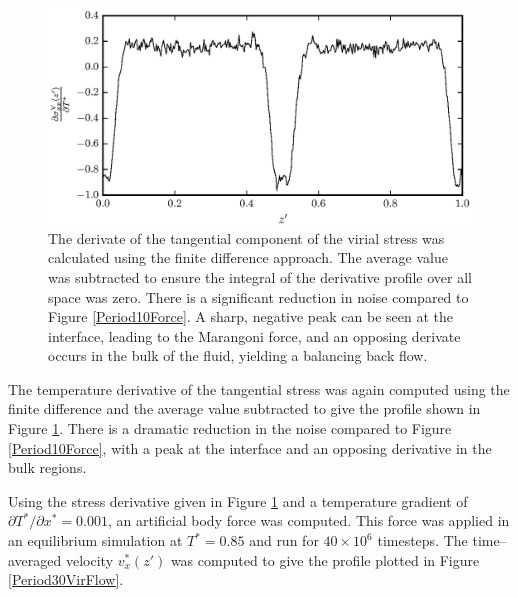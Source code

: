 \begin{figure}[h!]
\centering
\includegraphics[scale=1.0]{Period30VirForce}
\caption{The derivate of the tangential component of the virial stress was calculated using the finite difference approach.
The average value was subtracted to ensure the integral of the derivative profile over all space was zero.
There is a significant reduction in noise compared to Figure \ref{Period10Force}.
A sharp, negative peak can be seen at the interface, leading to the Marangoni force, and an opposing derivate occurs in the bulk of the fluid, yielding a balancing back flow.
}
\label{Period30VirForce}
\end{figure}

The temperature derivative of the tangential stress was again computed using the finite difference and the average value subtracted to give the profile shown in Figure \ref{Period30VirForce}.
There is a dramatic reduction in the noise compared to Figure \ref{Period10Force}, with a peak at the interface and an opposing derivative in the bulk regions.

Using the stress derivative given in Figure \ref{Period30VirForce} and a temperature gradient of $\partial T^{*} / \partial x^{*} = 0.001$, an artificial body force was computed.
This force was applied in an equilibrium simulation at $T^{*} = 0.85$ and run for $40 \times 10^{6}$ timesteps.
The time--averaged velocity $v^{*}_x(z')$ was computed to give the profile plotted in Figure \ref{Period30VirFlow}.

